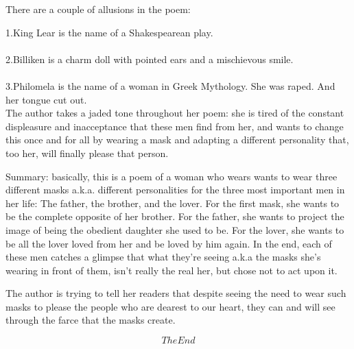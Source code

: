 \documentclass{slides}
\begin{document}
	There are a couple of allusions in the poem: 
	
	1.King Lear is the name of a Shakespearean play.\\
	\\2.Billiken is a charm doll with pointed ears and a mischievous smile.\\
	\\3.Philomela is the name of a woman in Greek Mythology. She was raped. And her tongue cut out.\\

	The author takes a jaded tone throughout her poem: she is tired of the constant displeasure and inacceptance that these men find from her, and wants to change this once and for all by wearing a mask and adapting a different personality that, too her, will finally please that person.

	Summary: basically, this is a poem of a woman who wears wants to wear three different masks a.k.a. different personalities for the three most important men in her life: The father, the brother, and the lover. For the first mask, she wants to be the complete opposite of her brother. For the father, she wants to project the image of being the obedient daughter she used to be. For the lover, she wants to be all the lover loved from her and be loved by him again. In the end, each of these men catches a glimpse that what they're seeing a.k.a the masks she's wearing in front of them, isn't really the real her, but chose not to act upon it.

	The author is trying to tell her readers that despite seeing the need to wear such masks to please the people who are dearest to our heart, they can and will see through the farce that the masks create.




	\[The End\]

	
\end{document}
